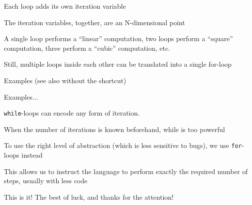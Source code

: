 \documentclass{beamer}
\begin{document}
\begin{slide}{
\item Each loop adds its own iteration variable
\item The iteration variables, together, are an N-dimensional point
\item A single loop performs a ``linear'' computation, two loops perform a ``square''     computation, three perform a ``cubic'' computation, etc.
\item Still, multiple loops inside each other can be translated into a single for-loop
\item Examples (see also without the shortcut)
}\end{slide}

\begin{slide}{
\item Examples...
}\end{slide}





\begin{slide}{
\item \texttt{while}-loops can encode any form of iteration.
\item When the number of iterations is known beforehand, while is too powerful
\item To use the right level of abstraction (which is less sensitive to bugs), we use \texttt{for}-loops instead
\item This allows us to instruct the language to perform exactly the required number of steps, usually with less code
}\end{slide}

\begin{frame}{This is it!}
\center
\fontsize{18pt}{7.2}\selectfont
The best of luck, and thanks for the attention!
\end{frame}
\end{document}
